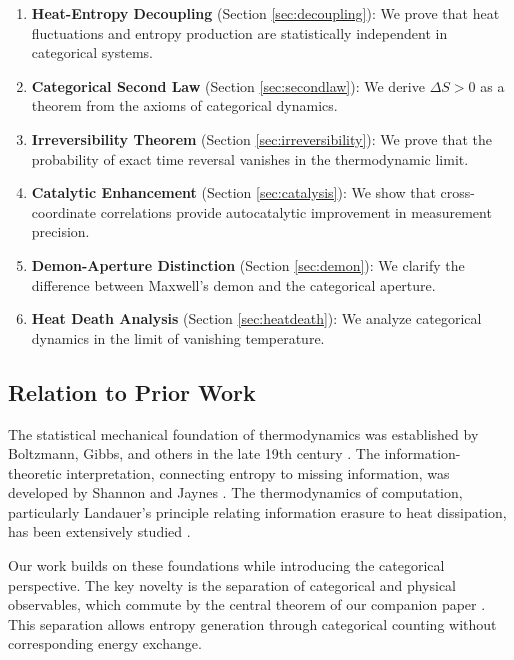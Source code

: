 \documentclass[twocolumn,10pt]{article}
\begin{document}
\begin{enumerate}
    \item \textbf{Heat-Entropy Decoupling} (Section \ref{sec:decoupling}): We prove that heat fluctuations and entropy production are statistically independent in categorical systems.

    \item \textbf{Categorical Second Law} (Section \ref{sec:secondlaw}): We derive $\Delta S > 0$ as a theorem from the axioms of categorical dynamics.

    \item \textbf{Irreversibility Theorem} (Section \ref{sec:irreversibility}): We prove that the probability of exact time reversal vanishes in the thermodynamic limit.

    \item \textbf{Catalytic Enhancement} (Section \ref{sec:catalysis}): We show that cross-coordinate correlations provide autocatalytic improvement in measurement precision.

    \item \textbf{Demon-Aperture Distinction} (Section \ref{sec:demon}): We clarify the difference between Maxwell's demon and the categorical aperture.

    \item \textbf{Heat Death Analysis} (Section \ref{sec:heatdeath}): We analyze categorical dynamics in the limit of vanishing temperature.
\end{enumerate}

\subsection{Relation to Prior Work}

The statistical mechanical foundation of thermodynamics was established by Boltzmann, Gibbs, and others in the late 19th century \cite{boltzmann1896,gibbs1902}. The information-theoretic interpretation, connecting entropy to missing information, was developed by Shannon and Jaynes \cite{shannon1948,jaynes1957}. The thermodynamics of computation, particularly Landauer's principle relating information erasure to heat dissipation, has been extensively studied \cite{landauer1961,bennett1982,bennett2003}.

Our work builds on these foundations while introducing the categorical perspective. The key novelty is the separation of categorical and physical observables, which commute by the central theorem of our companion paper \cite{shumba2026counting}. This separation allows entropy generation through categorical counting without corresponding energy exchange.
\end{document}
